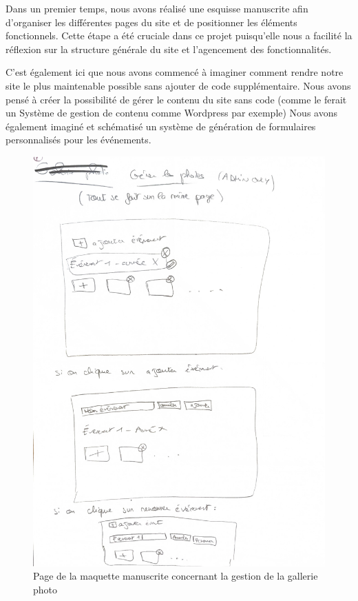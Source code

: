 Dans un premier temps, nous avons réalisé une esquisse manuscrite afin d’organiser les différentes pages du site et de positionner les éléments fonctionnels. Cette étape a été cruciale dans ce projet puisqu'elle nous a facilité la réflexion sur la structure générale du site et l'agencement des fonctionnalités.

C'est également ici que nous avons commencé à imaginer comment rendre notre site le plus maintenable possible sans ajouter de code supplémentaire. Nous avons pensé à créer la possibilité de gérer le contenu du site sans code (comme le ferait un Système de gestion de contenu comme Wordpress par exemple)
Nous avons également imaginé et schématisé un système de génération de formulaires personnalisés pour les événements.

\begin{figure}[H]
    \centering
    \includegraphics[scale=0.5]{assets/pictures/maquette.pdf}
    \captionsetup{justification=centering}
    \caption{Page de la maquette manuscrite concernant la gestion de la gallerie photo}
\end{figure}


